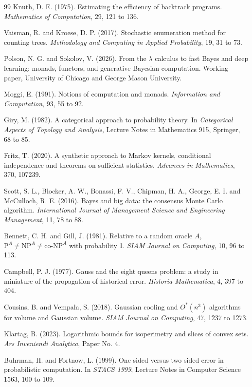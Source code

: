 \documentclass[11pt,twoside,openany]{book}
\theoremstyle{plain}
\theoremstyle{definition}
\theoremstyle{remark}
\begin{document}
\begin{thebibliography}{99}
 Knuth, D. E. (1975). Estimating the efficiency of backtrack programs. \emph{Mathematics of Computation}, 29, 121 to 136.

 Vaisman, R. and Kroese, D. P. (2017). Stochastic enumeration method for counting trees. \emph{Methodology and Computing in Applied Probability}, 19, 31 to 73.

 Polson, N. G. and Sokolov, V. (2026). From the $\lambda$ calculus to fast Bayes and deep learning: monads, functors, and generative Bayesian computation. Working paper, University of Chicago and George Mason University.

 Moggi, E. (1991). Notions of computation and monads. \emph{Information and Computation}, 93, 55 to 92.

 Giry, M. (1982). A categorical approach to probability theory. In \emph{Categorical Aspects of Topology and Analysis}, Lecture Notes in Mathematics 915, Springer, 68 to 85.

 Fritz, T. (2020). A synthetic approach to Markov kernels, conditional independence and theorems on sufficient statistics. \emph{Advances in Mathematics}, 370, 107239.

 Scott, S. L., Blocker, A. W., Bonassi, F. V., Chipman, H. A., George, E. I. and McCulloch, R. E. (2016). Bayes and big data: the consensus Monte Carlo algorithm. \emph{International Journal of Management Science and Engineering Management}, 11, 78 to 88.

 Bennett, C. H. and Gill, J. (1981). Relative to a random oracle $A$, $\mathrm{P}^A \neq \mathrm{NP}^A \neq \mathrm{co\text{-}NP}^A$ with probability 1. \emph{SIAM Journal on Computing}, 10, 96 to 113.

 Campbell, P. J. (1977). Gauss and the eight queens problem: a study in miniature of the propagation of historical error. \emph{Historia Mathematica}, 4, 397 to 404.

 Cousins, B. and Vempala, S. (2018). Gaussian cooling and $O^*(n^3)$ algorithms for volume and Gaussian volume. \emph{SIAM Journal on Computing}, 47, 1237 to 1273.

 Klartag, B. (2023). Logarithmic bounds for isoperimetry and slices of convex sets. \emph{Ars Inveniendi Analytica}, Paper No. 4.

 Buhrman, H. and Fortnow, L. (1999). One sided versus two sided error in probabilistic computation. In \emph{STACS 1999}, Lecture Notes in Computer Science 1563, 100 to 109.


\end{thebibliography}
\end{document}
